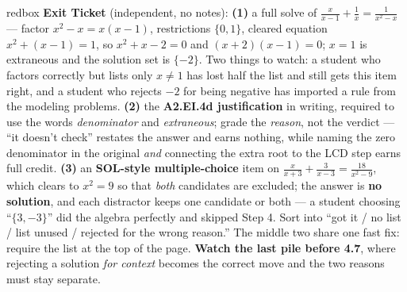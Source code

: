 \documentclass[10pt]{article}
\begin{document}
\begin{skillbox}{redbox}
\textbf{Exit Ticket} (independent, no notes): \textbf{(1)} a full solve of
$\frac{x}{x-1}+\frac{1}{x}=\frac{1}{x^2-x}$ --- factor $x^2-x=x(x-1)$, restrictions $\{0,1\}$, cleared
equation $x^2+(x-1)=1$, so $x^2+x-2=0$ and $(x+2)(x-1)=0$; $x=1$ is extraneous and the solution set is
$\{-2\}$. Two things to watch: a student who factors correctly but lists only $x\neq1$ has lost half the
list and still gets this item right, and a student who rejects $-2$ for being negative has imported a
rule from the modeling problems. \textbf{(2)} the \textbf{A2.EI.4d justification} in writing, required
to use the words \emph{denominator} and \emph{extraneous}; grade the \emph{reason}, not the verdict ---
``it doesn't check'' restates the answer and earns nothing, while naming the zero denominator in the
original \emph{and} connecting the extra root to the LCD step earns full credit. \textbf{(3)} an
\textbf{SOL-style multiple-choice} item on $\frac{x}{x+3}+\frac{3}{x-3}=\frac{18}{x^2-9}$, which clears
to $x^2=9$ so that \emph{both} candidates are excluded; the answer is \textbf{no solution}, and each
distractor keeps one candidate or both --- a student choosing ``$\{3,-3\}$'' did the algebra perfectly
and skipped Step 4. Sort into ``got it / no list / list unused / rejected for the wrong reason.'' The
middle two share one fast fix: require the list at the top of the page. \textbf{Watch the last pile
before 4.7}, where rejecting a solution \emph{for context} becomes the correct move and the two reasons
must stay separate.
\end{skillbox}
\end{document}
